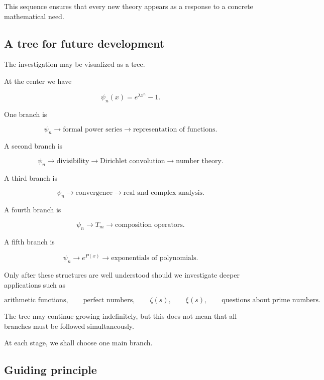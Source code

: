 This sequence ensures that every new theory appears as a response to a
concrete mathematical need.

\subsection{A tree for future development}

The investigation may be visualized as a tree.

At the center we have

\[
\boxed{
\psi_n(x)=e^{\lambda x^n}-1.
}
\]

One branch is

\[
\psi_n
\longrightarrow
\text{formal power series}
\longrightarrow
\text{representation of functions}.
\]

A second branch is

\[
\psi_n
\longrightarrow
\text{divisibility}
\longrightarrow
\text{Dirichlet convolution}
\longrightarrow
\text{number theory}.
\]

A third branch is

\[
\psi_n
\longrightarrow
\text{convergence}
\longrightarrow
\text{real and complex analysis}.
\]

A fourth branch is

\[
\psi_n
\longrightarrow
T_m
\longrightarrow
\text{composition operators}.
\]

A fifth branch is

\[
\psi_n
\longrightarrow
e^{P(x)}
\longrightarrow
\text{exponentials of polynomials}.
\]

Only after these structures are well understood should we investigate deeper
applications such as

\[
\text{arithmetic functions},
\qquad
\text{perfect numbers},
\qquad
\zeta(s),
\qquad
\xi(s),
\qquad
\text{questions about prime numbers}.
\]

The tree may continue growing indefinitely, but this does not mean that all
branches must be followed simultaneously.

At each stage, we shall choose one main branch.

\subsection{Guiding principle}

